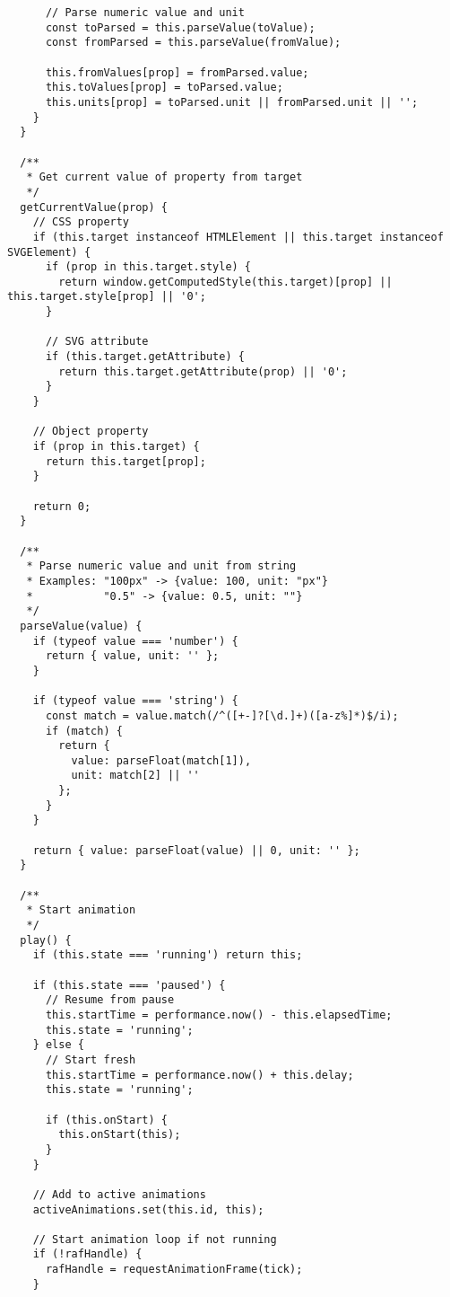 \documentclass[11pt]{article}
\begin{document}
\begin{verbatim}
      // Parse numeric value and unit
      const toParsed = this.parseValue(toValue);
      const fromParsed = this.parseValue(fromValue);
      
      this.fromValues[prop] = fromParsed.value;
      this.toValues[prop] = toParsed.value;
      this.units[prop] = toParsed.unit || fromParsed.unit || '';
    }
  }
  
  /**
   * Get current value of property from target
   */
  getCurrentValue(prop) {
    // CSS property
    if (this.target instanceof HTMLElement || this.target instanceof SVGElement) {
      if (prop in this.target.style) {
        return window.getComputedStyle(this.target)[prop] || this.target.style[prop] || '0';
      }
      
      // SVG attribute
      if (this.target.getAttribute) {
        return this.target.getAttribute(prop) || '0';
      }
    }
    
    // Object property
    if (prop in this.target) {
      return this.target[prop];
    }
    
    return 0;
  }
  
  /**
   * Parse numeric value and unit from string
   * Examples: "100px" -> {value: 100, unit: "px"}
   *           "0.5" -> {value: 0.5, unit: ""}
   */
  parseValue(value) {
    if (typeof value === 'number') {
      return { value, unit: '' };
    }
    
    if (typeof value === 'string') {
      const match = value.match(/^([+-]?[\d.]+)([a-z%]*)$/i);
      if (match) {
        return {
          value: parseFloat(match[1]),
          unit: match[2] || ''
        };
      }
    }
    
    return { value: parseFloat(value) || 0, unit: '' };
  }
  
  /**
   * Start animation
   */
  play() {
    if (this.state === 'running') return this;
    
    if (this.state === 'paused') {
      // Resume from pause
      this.startTime = performance.now() - this.elapsedTime;
      this.state = 'running';
    } else {
      // Start fresh
      this.startTime = performance.now() + this.delay;
      this.state = 'running';
      
      if (this.onStart) {
        this.onStart(this);
      }
    }
    
    // Add to active animations
    activeAnimations.set(this.id, this);
    
    // Start animation loop if not running
    if (!rafHandle) {
      rafHandle = requestAnimationFrame(tick);
    }
    

\end{verbatim}
\end{document}
